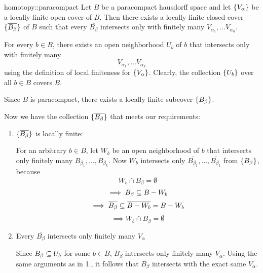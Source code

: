 \begin{mylemma}{homotopy::paracompact}{}
    Let $B$ be a paracompact hausdorff space and let $\{V_\alpha\}$
    be a locally finite open cover of $B$.
    Then there exists a locally finite closed cover $\{\overline{B_\beta}\}$ of $B$
    such that every $\overline{B_\beta}$ intersects only with
    finitely many $V_{\alpha_1}, \dots V_{\alpha_n}$.
\end{mylemma}

\begin{myproof}
    For every $b \in B$, there exists an open neighborhood $U_b$ of $b$ that intersects only with finitely many
    \[ V_{\alpha_1}, \dots V_{\alpha_k} \]
    using the definition of local finiteness for $\{V_\alpha\}$.
    Clearly, the collection $\{U_b\}$ over all $b \in B$ covers $B$.

    Since $B$ is paracompact, there exists a locally finite subcover $\{B_\beta\}$.

    Now we have the collection $\{\overline{B_\beta}\}$ that meets our requirements:
    \begin{enumerate}
        \item $\{\overline{B_\beta}\}$ is locally finite:
        
        For an arbitrary $b \in B$, let $W_b$ be an open neighborhood of $b$ that intersects only finitely many $B_{\beta_1}, \dots, B_{\beta_k}$.
        Now $W_b$ intersects only $\overline{B_{\beta_1}}, \dots, \overline{B_{\beta_1}}$ from $\{B_\beta\}$, because
        \[ W_b \cap B_\beta = \emptyset \]
        \[ \implies B_\beta \subseteq{} B - W_b \]
        \[ \implies \overline{B_\beta} \subseteq{} \overline{B - W_b} = B - W_b \]
        \[ \implies W_b \cap \overline{B_\beta} = \emptyset \]

        \item Every $\overline{B_\beta}$ intersects only finitely many $V_\alpha$
        
        Since $B_\beta \subseteq{} U_b$ for some $b \in B$, $B_\beta$ intersects only finitely many $V_\alpha$.
        Using the same arguments as in 1., it follows that $\overline{B_\beta}$ intersects with the exact same $V_\alpha$.
    \end{enumerate}
\end{myproof}